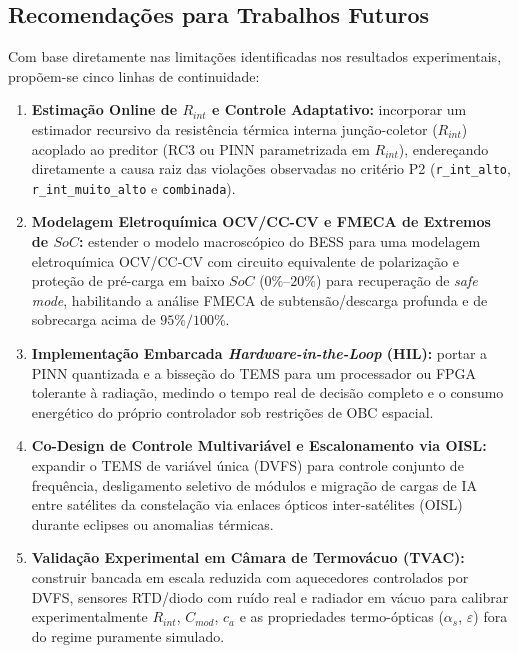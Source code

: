 \subsection{Recomendações para Trabalhos Futuros}
\label{sec:trabalhos_futuros_cap5}

Com base diretamente nas limitações identificadas nos resultados experimentais, propõem-se cinco linhas de continuidade:
\begin{enumerate}[label=\textbf{(\alph*)},leftmargin=*]
    \item \textbf{Estimação Online de $R_{int}$ e Controle Adaptativo:} incorporar um estimador recursivo da resistência térmica interna junção-coletor ($R_{int}$) acoplado ao preditor (RC3 ou PINN parametrizada em $R_{int}$), endereçando diretamente a causa raiz das violações observadas no critério P2 (\texttt{r\_int\_alto}, \texttt{r\_int\_muito\_alto} e \texttt{combinada}).
    \item \textbf{Modelagem Eletroquímica OCV/CC-CV e FMECA de Extremos de $SoC$:} estender o modelo macroscópico do BESS para uma modelagem eletroquímica OCV/CC-CV com circuito equivalente de polarização e proteção de pré-carga em baixo $SoC$ ($0\%\text{--}20\%$) para recuperação de \textit{safe mode}, habilitando a análise FMECA de subtensão/descarga profunda e de sobrecarga acima de $95\%/100\%$.
    \item \textbf{Implementação Embarcada \textit{Hardware-in-the-Loop} (HIL):} portar a PINN quantizada e a bisseção do TEMS para um processador ou FPGA tolerante à radiação, medindo o tempo real de decisão completo e o consumo energético do próprio controlador sob restrições de OBC espacial.
    \item \textbf{Co-Design de Controle Multivariável e Escalonamento via OISL:} expandir o TEMS de variável única (DVFS) para controle conjunto de frequência, desligamento seletivo de módulos e migração de cargas de IA entre satélites da constelação via enlaces ópticos inter-satélites (OISL) durante eclipses ou anomalias térmicas.
    \item \textbf{Validação Experimental em Câmara de Termovácuo (TVAC):} construir bancada em escala reduzida com aquecedores controlados por DVFS, sensores RTD/diodo com ruído real e radiador em vácuo para calibrar experimentalmente $R_{int}$, $C_{mod}$, $c_a$ e as propriedades termo-ópticas ($\alpha_s$, $\varepsilon$) fora do regime puramente simulado.
\end{enumerate}
